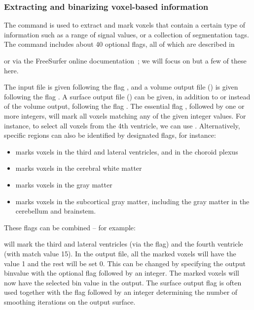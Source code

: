 \subsubsection*{Extracting and binarizing voxel-based information}

The {\freesurfer} command  is used to extract and
mark voxels that contain a certain type of information such as a range
of signal values, or a collection of segmentation tags. The command
includes about 40 optional flags, all of which are described in

\noindent or via the FreeSurfer online
documentation~\cite{freesurfer-wiki}; we will focus on but a few of
these here.

The input file is given following the flag , and a volume
output file () is given following the flag . A
surface output file () can be given, in addition to or
instead of the volume output, following the flag . The
essential flag , followed by one or more integers, will mark
all voxels matching any of the given integer values. For instance, to
select all voxels from the 4th ventricle, we can use . Alternatively, specific regions can also be identified by
designated flags, for instance:
\begin{itemize}
\item {} marks voxels in the third and lateral ventricles, and in the choroid plexus
\item {} marks voxels in the cerebral white matter 
\item {} marks voxels in the gray matter  
\item {} marks voxels in the subcortical gray matter, including the gray matter in the cerebellum and brainstem.  
\end{itemize}
These flags can be combined -- for example: 

\noindent will mark the third and lateral ventricles (via the
 flag) and the fourth ventricle (with match value
15). In the output file, all the marked voxels will have the value 1
and the rest will be set 0. This can be changed by specifying the
output binvalue with the optional flag  followed by an
integer. The marked voxels will now have the selected bin value in the
output. The surface output flag  is often used together
with the flag  followed by an integer determining
the number of smoothing iterations on the output surface. 

